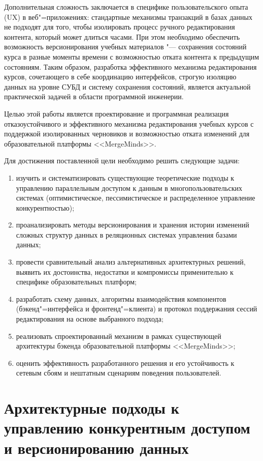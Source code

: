 \documentclass[coursework]{SCWorks}
\begin{document}
Дополнительная сложность заключается в специфике пользовательского опыта (UX) в веб"=приложениях: стандартные механизмы транзакций в базах данных не подходят для того, чтобы изолировать процесс ручного редактирования контента, который может длиться часами. При этом необходимо обеспечить возможность версионирования учебных материалов "--- сохранения состояний курса в разные моменты времени с возможностью отката контента к предыдущим состояниям. Таким образом, разработка эффективного механизма редактирования курсов, сочетающего в себе координацию интерфейсов, строгую изоляцию данных на уровне СУБД и систему сохранения состояний, является актуальной практической задачей в области программной инженерии.

Целью этой работы является проектирование и программная реализация отказоустойчивого и эффективного механизма редактирования учебных курсов с поддержкой изолированных черновиков и возможностью отката изменений для образовательной платформы <<MergeMinds>>.

Для достижения поставленной цели необходимо решить следующие задачи:

\begin{enumerate}
  \item изучить и систематизировать существующие теоретические подходы к управлению параллельным доступом к данным в многопользовательских системах (оптимистическое, пессимистическое и распределенное управление конкурентностью);
  \item проанализировать методы версионирования и хранения истории изменений сложных структур данных в реляционных системах управления базами данных;
  \item провести сравнительный анализ альтернативных архитектурных решений, выявить их достоинства, недостатки и компромиссы применительно к специфике образовательных платформ;
  \item разработать схему данных, алгоритмы взаимодействия компонентов (бэкенд"=интерфейса и фронтенд"=клиента) и протокол поддержания сессий редактирования на основе выбранного подхода;
  \item реализовать спроектированный механизм в рамках существующей архитектуры бэкенда образовательной платформы <<MergeMinds>>;
  \item оценить эффективность разработанного решения и его устойчивость к сетевым сбоям и нештатным сценариям поведения пользователей.
\end{enumerate}

\section{Архитектурные подходы к управлению конкурентным доступом и версионированию данных}
\end{document}
